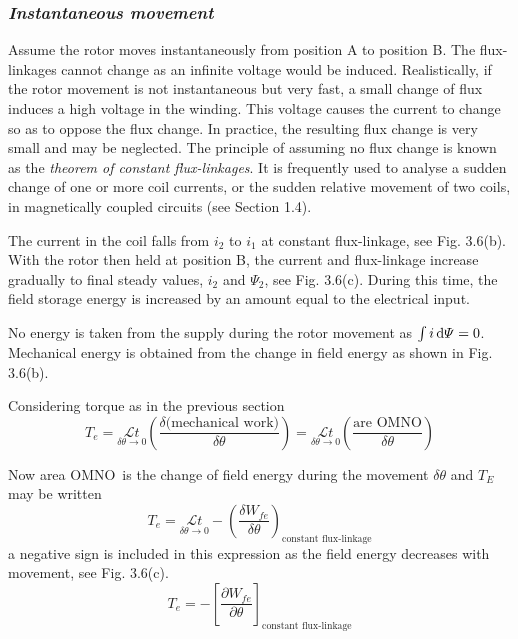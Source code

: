 \documentclass[a4paper,numbers=noenddot,12pt]{scrbook}
\begin{document}
\subsubsection{\textit{Instantaneous movement} }Assume the rotor moves instantaneously from position A to position B. The flux-linkages cannot change as an infinite voltage would be induced. Realistically, if the rotor movement is not instantaneous but very fast, a small change of flux induces a high voltage in the winding. This voltage causes the current to change so as to oppose the flux change. In practice, the resulting flux change is very small and may be neglected. The principle of
assuming no flux change is known as the \textit{theorem of constant flux-linkages}. It is frequently used to analyse a sudden change of one or more coil currents, or the sudden relative movement of two coils, in magnetically coupled circuits (see Section 1.4). 

The current in the coil falls from $i_2$ to $i_1$ at constant flux-linkage, see Fig. 3.6(b). With the rotor then held at position B, the current and flux-linkage increase gradually to final steady values, $i_2$ and $\varPsi_2$, see Fig. 3.6(c). During this time, the field storage energy is increased by an amount equal to the electrical input.

No energy is taken from the supply during the rotor movement as $\int i \dif \varPsi = 0$. Mechanical energy is obtained from the change in field energy as shown in Fig. 3.6(b).

Considering torque as in the previous section 
\begin{equation}
     T_e = \underset{\delta \theta \to 0}{\mathcal{L} t} \left(\dfrac{\delta \text{(mechanical work)}}{\delta \theta}\right) = \underset{\delta \theta \to 0}{\mathcal{L} t} \left(\dfrac{\text{are OMNO}}{\delta \theta}\right)
    \label{eq:Eq3.21}
\end{equation}

Now area OMNO\ is the change of field energy during the movement $\delta \theta$ and $T_E$ may be written 
\begin{equation}
    T_e = \underset{\delta \theta \to 0}{\mathcal{L} t} - {\left( \dfrac{\delta W_{fe}}{\delta \theta}\right)}_{\text{constant flux-linkage}}
    \label{eq:Ee3.22}
\end{equation}
a negative sign is included in this expression as the field energy decreases with movement, see Fig. 3.6(c). 
\begin{equation}
    T_e = - {\left[ \dfrac{\partial W_{fe}}{\partial \theta}\right]}_{\text{constant flux-linkage}}
    \label{eq_Eq3.23}
\end{equation}
\end{document}
